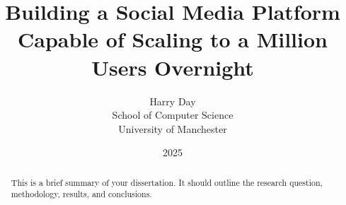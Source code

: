 \documentclass[12pt,a4paper]{report}
\title{Building a Social Media Platform Capable of Scaling to a Million Users Overnight}
\author{Harry Day\\School of Computer Science\\University of Manchester}
\date{2025}
\makeatletter
\def\@supervisor{}
\renewcommand{\maketitle}{
  \begin{titlepage}
    \centering
    {\Large \bfseries \@title \par}
    \vskip 1.5cm
    {\large \@author \par}
    \vskip 0.5cm
    {\large \@supervisor \par}
    \vskip 0.5cm
    {\large \@date \par}
    \vfill
  \end{titlepage}
}
\makeatother
\begin{document}
\maketitle

\begin{abstract}
  This is a brief summary of your dissertation. It should outline the research question, methodology, results, and conclusions. 
\end{abstract}

\tableofcontents
\listoffigures
\listoftables













\end{document}
